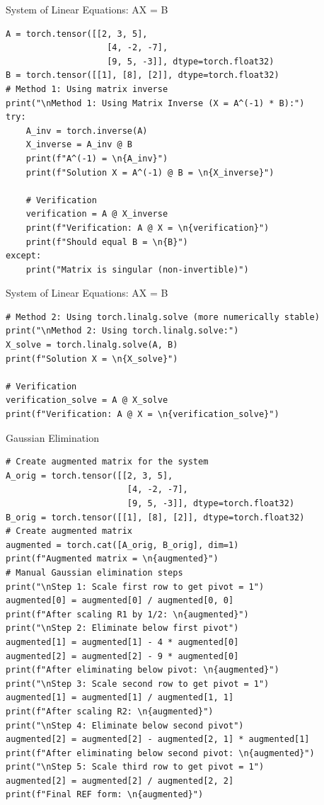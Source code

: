 \documentclass[aspectratio=169,xcolor=dvipsnames,svgnames,x11names,fleqn]{beamer}
\begin{document}
\begin{frame}[containsverbatim]{System of Linear Equations: AX = B}
\begin{verbatim}
A = torch.tensor([[2, 3, 5], 
                    [4, -2, -7], 
                    [9, 5, -3]], dtype=torch.float32)
B = torch.tensor([[1], [8], [2]], dtype=torch.float32)
# Method 1: Using matrix inverse
print("\nMethod 1: Using Matrix Inverse (X = A^(-1) * B):")
try:
    A_inv = torch.inverse(A)
    X_inverse = A_inv @ B
    print(f"A^(-1) = \n{A_inv}")
    print(f"Solution X = A^(-1) @ B = \n{X_inverse}")
    
    # Verification
    verification = A @ X_inverse
    print(f"Verification: A @ X = \n{verification}")
    print(f"Should equal B = \n{B}")
except:
    print("Matrix is singular (non-invertible)")

\end{verbatim}
\end{frame}



\begin{frame}[containsverbatim]{System of Linear Equations: AX = B}
\begin{verbatim}
# Method 2: Using torch.linalg.solve (more numerically stable)
print("\nMethod 2: Using torch.linalg.solve:")
X_solve = torch.linalg.solve(A, B)
print(f"Solution X = \n{X_solve}")

# Verification
verification_solve = A @ X_solve
print(f"Verification: A @ X = \n{verification_solve}")

\end{verbatim}
\end{frame}

\begin{frame}[containsverbatim]{Gaussian Elimination}
\begin{verbatim}
# Create augmented matrix for the system
A_orig = torch.tensor([[2, 3, 5], 
                        [4, -2, -7], 
                        [9, 5, -3]], dtype=torch.float32)
B_orig = torch.tensor([[1], [8], [2]], dtype=torch.float32)
# Create augmented matrix
augmented = torch.cat([A_orig, B_orig], dim=1)
print(f"Augmented matrix = \n{augmented}")
# Manual Gaussian elimination steps
print("\nStep 1: Scale first row to get pivot = 1")
augmented[0] = augmented[0] / augmented[0, 0]
print(f"After scaling R1 by 1/2: \n{augmented}")
print("\nStep 2: Eliminate below first pivot")
augmented[1] = augmented[1] - 4 * augmented[0]
augmented[2] = augmented[2] - 9 * augmented[0]
print(f"After eliminating below pivot: \n{augmented}")
print("\nStep 3: Scale second row to get pivot = 1")
augmented[1] = augmented[1] / augmented[1, 1]
print(f"After scaling R2: \n{augmented}")
print("\nStep 4: Eliminate below second pivot")
augmented[2] = augmented[2] - augmented[2, 1] * augmented[1]
print(f"After eliminating below second pivot: \n{augmented}")
print("\nStep 5: Scale third row to get pivot = 1")
augmented[2] = augmented[2] / augmented[2, 2]
print(f"Final REF form: \n{augmented}")
\end{verbatim}
\end{frame}
\end{document}

